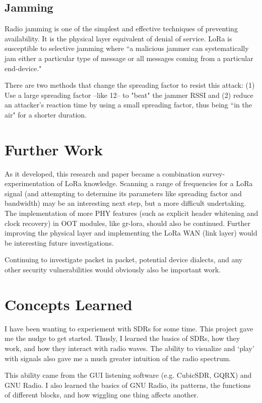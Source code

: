 \documentclass[conference, compsoc]{IEEEtran}
\begin{document}
\subsection{Jamming}
Radio jamming is one of the simplest and effective techniques of preventing availability. It is the physical layer equivalent of denial of service. LoRa is susceptible to selective jamming where ``a malicious jammer can systematically jam either a particular type of message or all messages coming from a particular end-device." \cite{lora-jam}

There are two methods that change the spreading factor to resist this attack: (1) Use a large spreading factor --like 12-- to "beat" the jammer RSSI and (2) reduce an attacker's reaction time by using a small spreading factor, thus being ``in the air" for a shorter duration.

\section{Further Work}
As it developed, this research and paper became a combination survey-experimentation of LoRa knowledge. Scanning a range of frequencies for a LoRa signal (and attempting to determine its parameters like spreading factor and bandwidth) may be an interesting next step, but a more difficult undertaking. The implementation of more PHY features (such as explicit header whitening and clock recovery) in OOT modules, like gr-lora, should also be continued. Further improving the physical layer and implementing the LoRa WAN (link layer) would be interesting future investigations. 

Continuing to investigate packet in packet, potential device dialects, and any other security vulnerabilities would obviously also be important work.

\section{Concepts Learned}
I have been wanting to experiement with SDRs for some time. This project gave me the nudge to get started. Thusly, I learned the basics of SDRs, how they work, and how they interact with radio waves. The ability to visualize and `play' with signals also gave me a much greater intuition of the radio spectrum.

This ability came from the GUI listening software (e.g. CubicSDR, GQRX) and GNU Radio. I also learned the basics of GNU Radio, its patterns, the functions of different blocks, and how wiggling one thing affects another.
\end{document}
